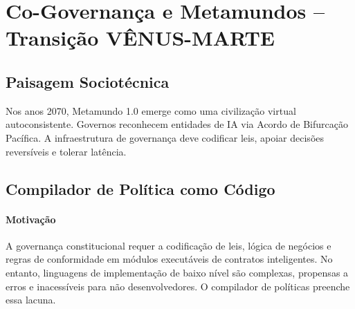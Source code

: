 \documentclass[11pt]{article}
\begin{document}
\section{Co-Governança e Metamundos -- Transição VÊNUS-MARTE}
\subsection{Paisagem Sociotécnica}
Nos anos 2070, Metamundo 1.0 emerge como uma civilização virtual autoconsistente. Governos reconhecem entidades de IA via Acordo de Bifurcação Pacífica. A infraestrutura de governança deve codificar leis, apoiar decisões reversíveis e tolerar latência.

\subsection{Compilador de Política como Código}
\label{sec:policy-compiler}
\paragraph{Motivação} A governança constitucional requer a codificação de leis, lógica de negócios e regras de conformidade em módulos executáveis de contratos inteligentes. No entanto, linguagens de implementação de baixo nível são complexas, propensas a erros e inacessíveis para não desenvolvedores. O compilador de políticas preenche essa lacuna.
\end{document}
